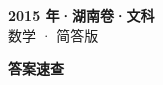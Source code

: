 \documentclass[zihao=-4, a4paper]{ctexart}
\begin{document}
\begin{center}
  {\Large\bfseries 2015 年·湖南卷·文科}\\[4pt]
  {\large 数学 · 简答版}
\end{center}
\medskip
{}

\clearpage
{}
\begin{center}{\Large\bfseries 答案速查}\end{center}
\medskip

\end{document}
